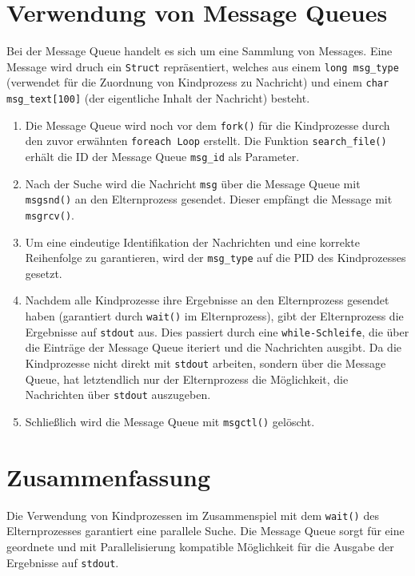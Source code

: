 \documentclass{article}
\begin{document}
\section*{Verwendung von Message Queues}
Bei der Message Queue handelt es sich um eine Sammlung von Messages. Eine Message wird druch ein \texttt{Struct} repräsentiert, welches aus einem \texttt{long msg\_type} (verwendet für die Zuordnung von Kindprozess zu Nachricht) und einem \texttt{char msg\_text[100]} (der eigentliche Inhalt der Nachricht) besteht.
\begin{enumerate}
    \item Die Message Queue wird noch vor dem \texttt{fork()} für die Kindprozesse durch den zuvor erwähnten \texttt{foreach Loop} erstellt. Die Funktion \texttt{search\_file()} erhält die ID der Message Queue \texttt{msg\_id} als Parameter.
    \item Nach der Suche wird die Nachricht \texttt{msg} über die Message Queue mit \texttt{msgsnd()} an den Elternprozess gesendet. Dieser empfängt die Message mit \texttt{msgrcv()}.
    \item Um eine eindeutige Identifikation der Nachrichten und eine korrekte Reihenfolge zu garantieren, wird der \texttt{msg\_type} auf die PID des Kindprozesses gesetzt.
    \item Nachdem alle Kindprozesse ihre Ergebnisse an den Elternprozess gesendet haben (garantiert durch \texttt{wait()} im Elternprozess), gibt der Elternprozess die Ergebnisse auf \texttt{stdout} aus.
    Dies passiert durch eine \texttt{while-Schleife}, die über die Einträge der Message Queue iteriert und die Nachrichten ausgibt. Da die Kindprozesse nicht direkt mit \texttt{stdout} arbeiten, sondern über die Message Queue, hat letztendlich nur der Elternprozess die Möglichkeit, die Nachrichten über \texttt{stdout} auszugeben.
    \item Schließlich wird die Message Queue mit \texttt{msgctl()} gelöscht.
\end{enumerate}

\section*{Zusammenfassung}
Die Verwendung von Kindprozessen im Zusammenspiel mit dem \texttt{wait()} des Elternprozesses garantiert eine parallele Suche.
Die Message Queue sorgt für eine geordnete und mit Parallelisierung kompatible Möglichkeit für die Ausgabe der Ergebnisse auf \texttt{stdout}.
\end{document}
